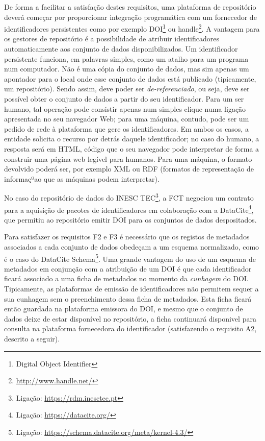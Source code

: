 \documentclass[sigconf,nonacm]{acmart}
\begin{document}
De forma a facilitar a satisfação destes requisitos, uma plataforma de repositório deverá começar por proporcionar integração programática com um fornecedor de identificadores persistentes como por exemplo DOI\footnote{Digital Object Identifier} ou handle\footnote{\url{http://www.handle.net/}}. A vantagem para os gestores de repositório é a possibilidade de atribuir identificadores automaticamente aos conjunto de dados disponibilizados. Um identificador persistente funciona, em palavras simples, como um atalho para um programa num computador. Não é uma cópia do conjunto de dados, mas sim apenas um apontador para o local onde esse conjunto de dados está publicado (tipicamente, um repositório). Sendo assim, deve poder ser \emph{de-referenciado}, ou seja, deve ser possível obter o conjunto de dados a partir do seu identificador. Para um ser humano, tal operação pode consistir apenas num simples clique numa ligação apresentada no seu navegador Web; para uma máquina, contudo, pode ser um pedido de rede à plataforma que gere os identificadores. Em ambos os casos, a entidade solicita o recurso por detrás daquele identificador; no caso do humano, a resposta será em HTML, código que o seu navegador pode interpretar de forma a construir  uma página web legível para humanos. Para uma máquina, o formato devolvido poderá ser, por exemplo XML ou RDF (formatos de representação de informaçºao que as máquinas podem interpretar). 

No caso do repositório de dados do INESC TEC\footnote{Ligação: \url{https://rdm.inesctec.pt}}, a FCT negociou um contrato para a aquisição de pacotes de identificadores em colaboração com a DataCite\footnote{Ligação: \url{https://datacite.org/}}, que permitiu ao repositório emitir DOI para os conjuntos de dados despositados. 

Para satisfazer os requisitos F2 e F3 é necessário que os registos de metadados associados a cada conjunto de dados obedeçam a um esquema normalizado, como é o caso do DataCite Schema\footnote{Ligação: \url{https://schema.datacite.org/meta/kernel-4.3/}}. Uma grande vantagem do uso de um esquema de metadados em conjunção com a atribuição de um DOI é que cada identificador ficará associado a uma ficha de metadados no momento da \emph{cunhagem} do DOI. Tipicamente, as plataformas de emissão de identificadores não permitem sequer a sua cunhagem sem o preenchimento dessa ficha de metadados. Esta ficha ficará então guardada na plataforma emissora do DOI, e mesmo que o conjunto de dados deixe de estar disponível no repositório, a ficha continuará disponivel para consulta na plataforma fornecedora do identificador (satisfazendo o requisito A2, descrito a seguir).
\end{document}
